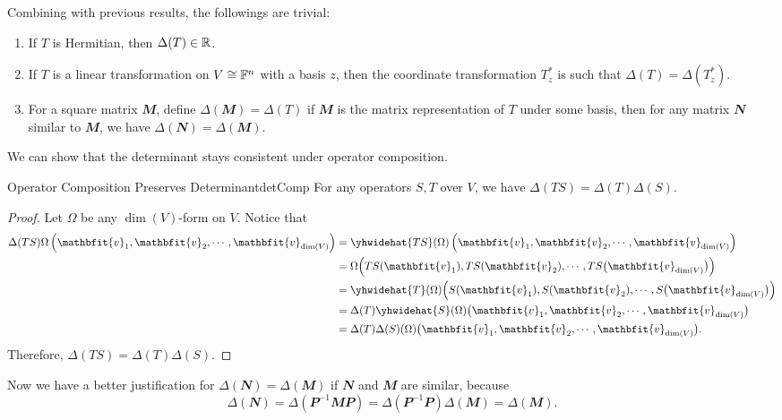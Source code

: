 \documentclass[math, code]{amznotes}
\theoremstyle{remark}
\begin{document}
Combining with previous results, the followings are trivial:
\begin{enumerate}
    \item If $T$ is Hermitian, then $\Delta(T) \in \mathbb{R}$.
    \item If $T$ is a linear transformation on $V \cong \mathbb{F}^n$ with a basis $z$, then the coordinate transformation $T^*_z$ is such that $\Delta(T) = \Delta\left(T^*_z\right)$.
    \item For a square matrix $\mathbfit{M}$, define $\Delta(\mathbfit{M}) = \Delta(T)$ if $\mathbfit{M}$ is the matrix representation of $T$ under some basis, then for any matrix $\mathbfit{N}$ similar to $\mathbfit{M}$, we have $\Delta(\mathbfit{N}) = \Delta(\mathbfit{M})$.
\end{enumerate}
We can show that the determinant stays consistent under operator composition.
\begin{probox}{Operator Composition Preserves Determinant}{detComp}
    For any operators $S, T$ over $V$, we have $\Delta(TS) = \Delta(T)\Delta(S)$.
    \tcblower
    \begin{proof}
        Let $\Omega$ be any $\dim(V)$-form on $V$. Notice that 
        \begin{align*}
            \Delta(TS)\Omega\left(\mathbfit{v}_1, \mathbfit{v}_2, \cdots, \mathbfit{v}_{\dim(V)}\right) & = \yhwidehat{TS}(\Omega)\left(\mathbfit{v}_1, \mathbfit{v}_2, \cdots, \mathbfit{v}_{\dim(V)}\right) \\
            & = \Omega\Bigl(TS(\mathbfit{v}_1), TS(\mathbfit{v}_2), \cdots, TS\bigl(\mathbfit{v}_{\dim(V)}\bigr)\Bigr) \\
            & = \yhwidehat{T}(\Omega)\Bigl(S(\mathbfit{v}_1), S(\mathbfit{v}_2), \cdots, S\bigl(\mathbfit{v}_{\dim(V)}\bigr)\Bigr) \\
            & = \Delta(T)\yhwidehat{S}(\Omega)\bigl(\mathbfit{v}_1, \mathbfit{v}_2, \cdots, \mathbfit{v}_{\dim(V)}\bigr) \\
            & = \Delta(T)\Delta(S)(\Omega)\bigl(\mathbfit{v}_1, \mathbfit{v}_2, \cdots, \mathbfit{v}_{\dim(V)}\bigr).
        \end{align*}
        Therefore, $\Delta(TS) = \Delta(T)\Delta(S)$.
    \end{proof}
\end{probox}
Now we have a better justification for $\Delta(\mathbfit{N}) = \Delta(\mathbfit{M})$ if $\mathbfit{N}$ and $\mathbfit{M}$ are similar, because 
\begin{equation*}
    \Delta(\mathbfit{N}) = \Delta\left(\mathbfit{P}^{-1}\mathbfit{M}\mathbfit{P}\right) = \Delta\left(\mathbfit{P}^{-1}\mathbfit{P}\right)\Delta(\mathbfit{M}) = \Delta(\mathbfit{M}).
\end{equation*}
\end{document}
